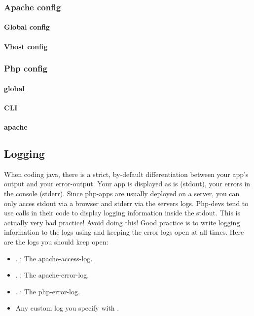 \subsubsection{Apache config}
\paragraph{Global config}
\paragraph{Vhost config}

\subsubsection{Php config}
\paragraph{global}
\paragraph{CLI}
\paragraph{apache}




\subsection{Logging}
When coding java, there is a strict, by-default differentiation between your app's output and your error-output. Your app is displayed as is (stdout), your errors in the console (stderr). Since php-apps are usually deployed on a server, you can only acces stdout via a browser and stderr via the servers logs. Php-devs tend to use  calls in their code to display logging information inside the stdout. This is actually very bad practice! Avoid doing this! Good practice is to write logging information to the logs using  and keeping the error logs open at all times. 
Here are the logs you should keep open: 
\begin{itemize}
    \item \verb ...  : The apache-access-log.
    \item \verb ...  : The apache-error-log.
    \item \verb ...  : The php-error-log.
    \item Any custom log you specify with .
\end{itemize}

